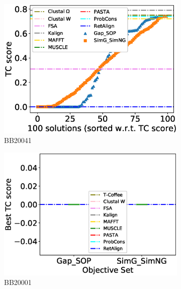 \begin{figure}[!htbp]
\begin{adjustwidth}{-1.5cm}{-1cm}
\begin{subfigure}{0.22\textwidth}
			\includegraphics[width=\columnwidth]{Figure/summary/precomputedInit/Balibase/BB20041_tc_density_single_run_2}
			\caption{BB20041}
		\end{subfigure}
		\begin{subfigure}{0.22\textwidth}
			\includegraphics[width=\columnwidth]{Figure/summary/precomputedInit/Balibase/BB20001_objset_tc_rank_2}
			\caption{BB20001}
		\end{subfigure}	
		\begin{subfigure}{0.22\textwidth}

\end{subfigure}
\end{adjustwidth}
\end{figure}
